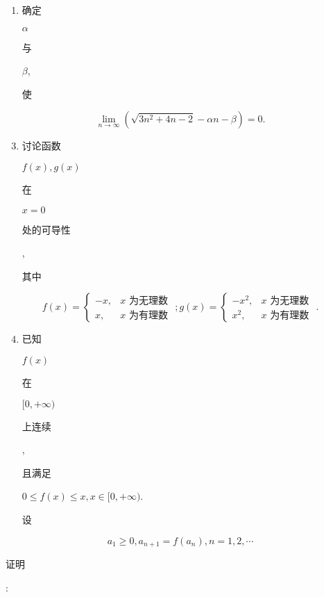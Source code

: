 \documentclass[10pt]{article}
\begin{document}
\begin{enumerate}
  \item \begin{CJK}{UTF8}{mj}确定\end{CJK} $\alpha$ \begin{CJK}{UTF8}{mj}与\end{CJK} $\beta$, \begin{CJK}{UTF8}{mj}使\end{CJK}
\end{enumerate}
$$
\lim _{n \rightarrow \infty}\left(\sqrt{3 n^{2}+4 n-2}-\alpha n-\beta\right)=0 .
$$

\begin{enumerate}
  \setcounter{enumi}{2}
  \item \begin{CJK}{UTF8}{mj}讨论函数\end{CJK} $f(x), g(x)$ \begin{CJK}{UTF8}{mj}在\end{CJK} $x=0$ \begin{CJK}{UTF8}{mj}处的可导性\end{CJK}, \begin{CJK}{UTF8}{mj}其中\end{CJK}
\end{enumerate}
$$
f(x)=\left\{\begin{array}{ll}
-x, & x \text { 为无理数 } \\
x, & x \text { 为有理数 }
\end{array} ; g(x)=\left\{\begin{array}{ll}
-x^{2}, & x \text { 为无理数 } \\
x^{2}, & x \text { 为有理数 }
\end{array} .\right.\right.
$$

\begin{enumerate}
  \setcounter{enumi}{3}
  \item \begin{CJK}{UTF8}{mj}已知\end{CJK} $f(x)$ \begin{CJK}{UTF8}{mj}在\end{CJK} $[0,+\infty)$ \begin{CJK}{UTF8}{mj}上连续\end{CJK}, \begin{CJK}{UTF8}{mj}且满足\end{CJK} $0 \leq f(x) \leq x, x \in[0,+\infty)$. \begin{CJK}{UTF8}{mj}设\end{CJK}
\end{enumerate}
$$
a_{1} \geq 0, a_{n+1}=f\left(a_{n}\right), n=1,2, \cdots
$$
\begin{CJK}{UTF8}{mj}证明\end{CJK}:
\end{document}
